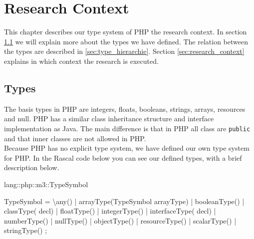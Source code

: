 \documentclass[../main.tex]{subfiles}
\begin{document}
    \chapter{Research Context}\label{ch:research_context}

	This chapter describes our type system of PHP the research context.
    In section \ref{sec:types} we will explain more about the types we have defined.
    The relation between the types are described in \ref{sec:type_hierarchie}.
    Section \ref{sec:research_context} explains in which context the research is executed.
    
	\section{Types}\label{sec:types}
	The basis types in PHP are integers, floats, booleans, strings, arrays, resources and null.
	PHP has a similar class inheritance structure and interface implementation as Java.
    The main difference is that in PHP all class are \texttt{public} and that inner classes are not allowed in PHP. 
    \\
	Because PHP has no explicit type system, we have defined our own type system for PHP.
	In the Rascal code below you can see our defined types, with a brief description below.

    \begin{rascal}
 lang::php::m3::TypeSymbol
 
 TypeSymbol
  = \textbackslash{}any()\footnotemark                         {}
  | arrayType(TypeSymbol arrayType) 
  | booleanType()                   
  | classType( decl)             
  | floatType()                     
  | integerType()                   
  | interfaceType( decl)         
  | numberType()                    
  | nullType()                      
  | objectType()                    
  | resourceType()                  
  | scalarType()                    
  | stringType()                    
  ; 
    \end{rascal}
    
\end{document}
